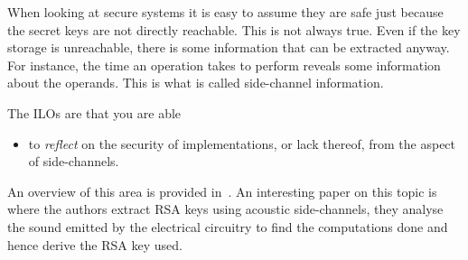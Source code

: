 When looking at secure systems it is easy to assume they are safe just because 
the secret keys are not directly reachable.
This is not always true.
Even if the key storage is unreachable, there is some information that can be 
extracted anyway.
For instance, the time an operation takes to perform reveals some information 
about the operands.
This is what is called side-channel information.

The \acp{ILO} are that you are able
\begin{itemize}
  \item to \emph{reflect} on the security of implementations, or lack thereof, 
    from the aspect of side-channels.
\end{itemize}

An overview of this area is provided in~\cite[Ch.~17]{Anderson2008sea}.
An interesting paper on this topic is 
~\cite{genkin2013rsa} where the authors extract RSA 
keys using acoustic side-channels, \ie they analyse the sound emitted by the 
electrical circuitry to find the computations done and hence derive the RSA key 
used.
